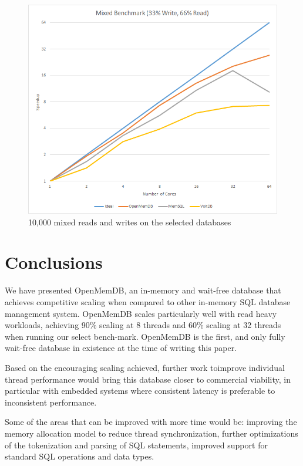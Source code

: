 \documentclass[conference, compsoc]{IEEEtran}
\begin{document}
\begin{figure}[H]
 \begin{center}
   \includegraphics[scale=.5]{MixedBenchmark.png}
  \caption{10,000 mixed reads and writes on the selected databases}
  \label{fig:mixedBenchmark}
   \end{center}
\end{figure}

\section{Conclusions}
We have presented OpenMemDB, an in-memory and wait-free database that achieves competitive scaling when compared to other
in-memory SQL database management system.  OpenMemDB scales particularly well with read heavy workloads, achieving 90\% 
scaling at 8 threads and 60\% scaling at 32 threads when running our select bench-mark. OpenMemDB is the first, and only fully
wait-free database in existence at the time of writing this paper. 
\par\vspace{\baselineskip}
Based on the encouraging scaling achieved, further work toimprove individual thread performance would bring this database
closer to commercial viability, in particular with embedded systems where consistent latency is preferable to inconsistent
performance. 
\par\vspace{\baselineskip}
Some of the areas that can be improved with more time would be: improving the memory allocation model to reduce thread
synchronization, further optimizations of the tokenization and parsing of SQL statements, improved support for standard
SQL operations and data types.

\newpage


\newpage
\end{document}
